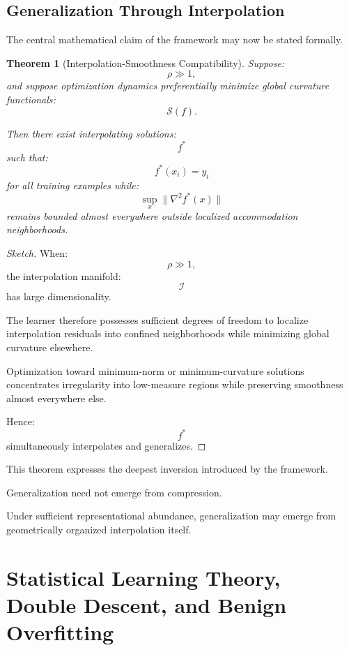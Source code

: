 \documentclass[12pt,a4paper]{article}
\newtheorem{theorem}{Theorem}[section]
\begin{document}
\subsection{Generalization Through Interpolation}

The central mathematical claim of the framework may now be stated formally.

\begin{theorem}[Interpolation-Smoothness Compatibility]
Suppose:
\[
\rho
\gg
1,
\]
and suppose optimization dynamics preferentially minimize global curvature functionals:
\[
\mathcal{S}(f).
\]

Then there exist interpolating solutions:
\[
f^\ast
\]
such that:
\[
f^\ast(x_i)=y_i
\]
for all training examples while:
\[
\sup_{x}
\|\nabla^2 f^\ast(x)\|
\]
remains bounded almost everywhere outside localized accommodation neighborhoods.
\end{theorem}

\begin{proof}[Sketch]
When:
\[
\rho
\gg
1,
\]
the interpolation manifold:
\[
\mathcal{I}
\]
has large dimensionality.

The learner therefore possesses sufficient degrees of freedom to localize interpolation residuals into confined neighborhoods while minimizing global curvature elsewhere.

Optimization toward minimum-norm or minimum-curvature solutions concentrates irregularity into low-measure regions while preserving smoothness almost everywhere else.

Hence:
\[
f^\ast
\]
simultaneously interpolates and generalizes.
\end{proof}

This theorem expresses the deepest inversion introduced by the framework.

Generalization need not emerge from compression.

Under sufficient representational abundance, generalization may emerge from geometrically organized interpolation itself.


\section{Statistical Learning Theory, Double Descent, and Benign Overfitting}
\end{document}
